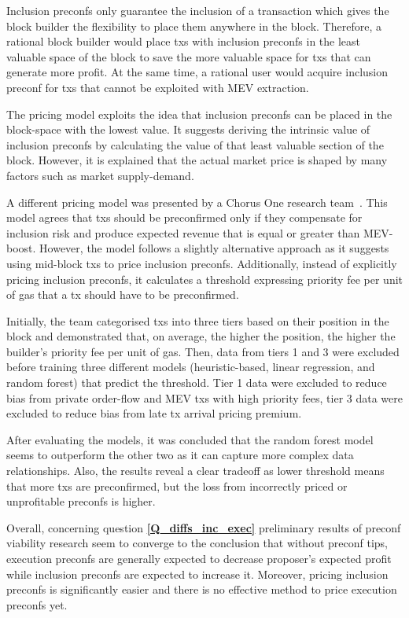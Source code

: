 \documentclass[a4paper]{article}
\theoremstyle{boldstyle}
\begin{document}
    Inclusion preconfs only guarantee the inclusion of a transaction which gives the block builder the flexibility to place them anywhere in the block. Therefore, a rational block builder would place txs with inclusion preconfs in the least valuable space of the block to save the more valuable space for txs that can generate more profit. At the same time, a rational user would acquire inclusion preconf for txs that cannot be exploited with MEV extraction.

    The pricing model exploits the idea that inclusion preconfs can be placed in the block-space with the lowest value. It suggests deriving the intrinsic value of inclusion preconfs by calculating the value of that least valuable section of the block. However, it is explained that the actual market price is shaped by many factors such as market supply-demand.

    A different pricing model was presented by a Chorus One research team~\cite{W:PricingTransactionsforPreconfirmation}. This model agrees that txs should be preconfirmed only if they compensate for inclusion risk and produce expected revenue that is equal or greater than MEV-boost. However, the model follows a slightly alternative approach as it suggests using mid-block txs to price inclusion preconfs. Additionally, instead of explicitly pricing inclusion preconfs, it calculates a threshold expressing priority fee per unit of gas that a tx should have to be preconfirmed.

    Initially, the team categorised txs into three tiers based on their position in the block and demonstrated that, on average, the higher the position, the higher the builder's priority fee per unit of gas. Then, data from tiers 1 and 3 were excluded before training three different models (heuristic-based, linear regression, and random forest) that predict the threshold. Tier 1 data were excluded to reduce bias from private order-flow and MEV txs with high priority fees, tier 3 data were excluded to reduce bias from late tx arrival pricing premium.

    After evaluating the models, it was concluded that the random forest model seems to outperform the other two as it can capture more complex data relationships. Also, the results reveal a clear tradeoff as lower threshold means that more txs are preconfirmed, but the loss from incorrectly priced or unprofitable preconfs is higher.

    Overall, concerning question \textbf{\ref{Q_diffs_inc_exec}} preliminary results of preconf viability research seem to converge to the conclusion that without preconf tips, execution preconfs are generally expected to decrease proposer's expected profit while inclusion preconfs are expected to increase it. Moreover, pricing inclusion preconfs is significantly easier and there is no effective method to price execution preconfs yet.
\end{document}
